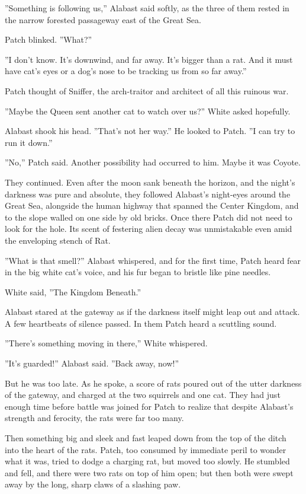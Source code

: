 \documentclass[12pt]{book}
\begin{document}
''Something is following us,'' Alabast said softly, as the three of
them rested in the narrow forested passageway east of the Great Sea.

Patch blinked. ''What?''

''I don't know. It's downwind, and far away. It's bigger than a
rat. And it must have cat's eyes or a dog's nose to be tracking us
from so far away.''

Patch thought of Sniffer, the arch-traitor and architect of all this
ruinous war.

''Maybe the Queen sent another cat to watch over us?'' White asked
hopefully.

Alabast shook his head. ''That's not her way.'' He looked to
Patch. ''I can try to run it down.''

''No,'' Patch said. Another possibility had occurred to him. Maybe it
was Coyote.

They continued. Even after the moon sank beneath the horizon, and the
night's darkness was pure and absolute, they followed Alabast's
night-eyes around the Great Sea, alongside the human highway that
spanned the Center Kingdom, and to the slope walled on one side by old
bricks. Once there Patch did not need to look for the hole. Its scent
of festering alien decay was unmistakable even amid the enveloping
stench of Rat.

''What is that smell?'' Alabast whispered, and for the first time,
Patch heard fear in the big white cat's voice, and his fur began to
bristle like pine needles.

White said, ''The Kingdom Beneath.''

Alabast stared at the gateway as if the darkness itself might leap out
and attack. A few heartbeats of silence passed. In them Patch heard a
scuttling sound.

''There's something moving in there,'' White whispered.

''It's guarded!'' Alabast said. ''Back away, now!''

But he was too late. As he spoke, a score of rats poured out of the
utter darkness of the gateway, and charged at the two squirrels and
one cat. They had just enough time before battle was joined for Patch
to realize that despite Alabast's strength and ferocity, the rats were
far too many.

Then something big and sleek and fast leaped down from the top of the
ditch into the heart of the rats. Patch, too consumed by immediate
peril to wonder what it was, tried to dodge a charging rat, but moved
too slowly. He stumbled and fell, and there were two rats on top of
him open; but then both were swept away by the long, sharp claws of a
slashing paw.
\end{document}
